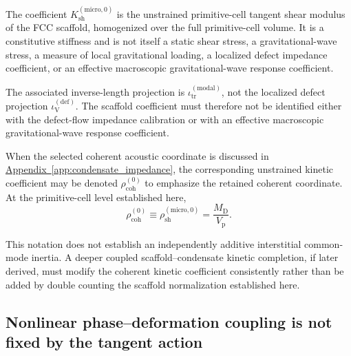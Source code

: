 The coefficient $K_{\mathrm{sh}}^{(\mathrm{micro},0)}$ is the unstrained primitive-cell tangent shear modulus of the FCC scaffold, homogenized over the full primitive-cell volume. It is a constitutive stiffness and is not itself a static shear stress, a gravitational-wave stress, a measure of local gravitational loading, a localized defect impedance coefficient, or an effective macroscopic gravitational-wave response coefficient.

The associated inverse-length projection is $\iota_{\mathrm{tr}}^{(\mathrm{modal})}$, not the localized defect projection $\iota_{\mathrm{V}}^{(\mathrm{def})}$. The scaffold coefficient must therefore not be identified either with the defect-flow impedance calibration or with an effective macroscopic gravitational-wave response coefficient.

When the selected coherent acoustic coordinate is discussed in \hyperref[app:condensate_impedance]{Appendix~\ref*{app:condensate_impedance}}, the corresponding unstrained kinetic coefficient may be denoted $\rho_{\mathrm{coh}}^{(0)}$ to emphasize the retained coherent coordinate. At the primitive-cell level established here,
\begin{equation}
    \rho_{\mathrm{coh}}^{(0)}
    \equiv
    \rho_{\mathrm{sh}}^{(\mathrm{micro},0)}
    =
    \frac{M_{\mathrm{D}}}{V_{\mathrm{p}}}.
\end{equation}

This notation does not establish an independently additive interstitial common-mode inertia. A deeper coupled scaffold--condensate kinetic completion, if later derived, must modify the coherent kinetic coefficient consistently rather than be added by double counting the scaffold normalization established here.


\subsection*{Nonlinear phase--deformation coupling is not fixed by the tangent action}
\label{sec:D_phase_deformation_diagnostic}

